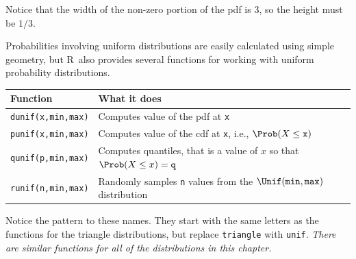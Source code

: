 \documentclass[twoside]{book}\usepackage[]{graphicx}\usepackage[]{xcolor}
\def\R{{\sf R}}
\begin{document}
Notice that the width of the non-zero portion of the pdf is 3, so the height must be $1/3$.

Probabilities involving uniform distributions are easily calculated using simple geometry,
but \R\ also provides several functions for working with uniform probability distributions.

\begin{center}
\begin{tabular}{ll}
	\hline
	Function & What it does \\
	\hline
	\texttt{dunif(x,min,max)} & Computes value of the pdf at \texttt{x}
	\\
	\texttt{punif(x,min,max)} & Computes value of the cdf at \texttt{x}, i.e., 
	$\Prob(X \le \texttt{x})$
	\\
	\texttt{qunif(p,min,max)} & Computes quantiles, that is a value of $x$ so that 
								$\Prob(X \le x) = \texttt{q}$
    \\
	\texttt{runif(n,min,max)} & Randomly samples \texttt{n} values from the 
								$\Unif(\texttt{min}, \texttt{max})$ distribution
	\\
	\hline
\end{tabular}
\end{center}

Notice the pattern to these names.  They start with the same letters as 
the functions for the triangle distributions, but replace \texttt{triangle}
with \texttt{unif}.  \emph{There are similar functions for all of the distributions
in this chapter.}
\end{document}
